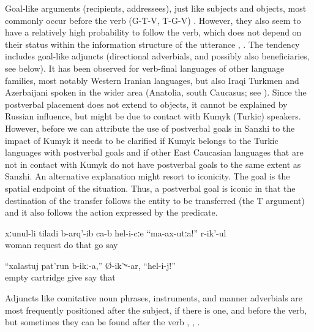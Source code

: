 Goal-like arguments (recipients, addressees), just like subjects and objects, most commonly occur before the verb (G-T-V, T-G-V) . However, they also seem to have a relatively high probability to follow the verb, which does not depend on their status within the information structure of the utterance , . The tendency includes goal-like adjuncts (directional adverbials, and possibly also beneficiaries, see below). It has been observed for verb-final languages of other language families, most notably Western Iranian languages, but also Iraqi Turkmen and Azerbaijani spoken in the wider area (Anatolia, south Caucasus; see \citealp{Haig2014}). Since the postverbal placement does not extend to objects, it cannot be explained by Russian influence, but might be due to contact with Kumyk (Turkic) speakers. However, before we can attribute the use of postverbal goals in Sanzhi to the impact of Kumyk it needs to be clarified if Kumyk belongs to the Turkic languages with postverbal goals and if other East Caucasian languages that are not in contact with Kumyk do not have postverbal goals to the same extent as Sanzhi. An alternative explanation might resort to iconicity. The goal is the spatial endpoint of the situation. Thus, a postverbal goal is iconic in that the destination of the transfer follows the entity to be transferred (the T argument) and it also follows the action expressed by the predicate.
%
\begin{exe}
	\ex	\label{ex:‎His wife begged him, Do not go constituents}
	\gll	xːunul-li	tiladi	b-arq'-ib	ca-b	hel-i-cːe	``ma-ax-utːa!''	r-ik'-ul\\
		woman	request	do		that	go	say\\
	\glt	{}

	\ex	\label{ex:He said, Give him an empty cartridge!}
	\gll	``xalastuj	pat'run	b-ikː-a,''	Ø-ik'ʷ-ar,	``hel-i-j!''\\
		empty	cartridge	give	say	that\\
	\glt	{}
\end{exe}

Adjuncts like comitative noun phrases, instruments, and manner adverbials are most frequently positioned after the subject, if there is one, and before the verb, but sometimes they can be found after the verb , , . 

